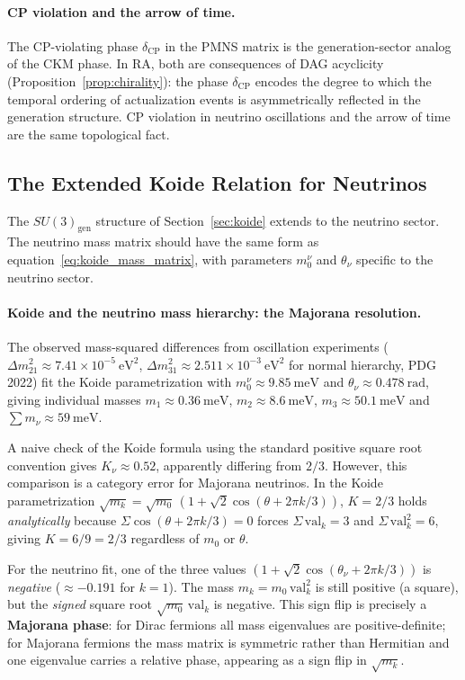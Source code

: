 \documentclass[11pt,a4paper]{article}
\begin{document}
\paragraph{CP violation and the arrow of time.}
The CP-violating phase $\delta_{\mathrm{CP}}$ in the PMNS matrix is the
generation-sector analog of the CKM phase. In RA, both are consequences of
DAG acyclicity (Proposition~\ref{prop:chirality}): the phase $\delta_{\mathrm{CP}}$
encodes the degree to which the temporal ordering of actualization events is
asymmetrically reflected in the generation structure. CP violation in neutrino
oscillations and the arrow of time are the same topological fact.

\subsection{The Extended Koide Relation for Neutrinos}

The $SU(3)_{\mathrm{gen}}$ structure of Section~\ref{sec:koide} extends to
the neutrino sector. The neutrino mass matrix should have the same form
as equation~\eqref{eq:koide_mass_matrix}, with parameters
$m_0^\nu$ and $\theta_\nu$ specific to the neutrino sector.

\paragraph{Koide and the neutrino mass hierarchy: the Majorana resolution.}
The observed mass-squared differences from oscillation experiments
($\Delta m^2_{21} \approx 7.41 \times 10^{-5}~\text{eV}^2$,
$\Delta m^2_{31} \approx 2.511 \times 10^{-3}~\text{eV}^2$ for normal hierarchy,
PDG 2022) fit the Koide parametrization with $m_0^\nu \approx 9.85~\text{meV}$ and
$\theta_\nu \approx 0.478~\text{rad}$, giving individual masses
$m_1 \approx 0.36~\text{meV}$, $m_2 \approx 8.6~\text{meV}$,
$m_3 \approx 50.1~\text{meV}$ and $\sum m_\nu \approx 59~\text{meV}$.

A naive check of the Koide formula using the standard positive square root
convention gives $K_\nu \approx 0.52$, apparently differing from $2/3$.
However, this comparison is a category error for Majorana neutrinos.
In the Koide parametrization
$\sqrt{m_k} = \sqrt{m_0}\,(1 + \sqrt{2}\cos(\theta + 2\pi k/3))$,
$K = 2/3$ holds \emph{analytically} because $\Sigma \cos(\theta + 2\pi k/3) = 0$
forces $\Sigma\,\mathrm{val}_k = 3$ and $\Sigma\,\mathrm{val}_k^2 = 6$,
giving $K = 6/9 = 2/3$ regardless of $m_0$ or $\theta$.

For the neutrino fit, one of the three values
$(1 + \sqrt{2}\cos(\theta_\nu + 2\pi k/3))$ is \emph{negative} ($\approx -0.191$
for $k=1$). The mass $m_k = m_0\,\mathrm{val}_k^2$ is still positive (a square),
but the \emph{signed} square root $\sqrt{m_0}\,\mathrm{val}_k$ is negative.
This sign flip is precisely a \textbf{Majorana phase}: for Dirac fermions all
mass eigenvalues are positive-definite; for Majorana fermions the mass matrix is
symmetric rather than Hermitian and one eigenvalue carries a relative phase,
appearing as a sign flip in $\sqrt{m_k}$.
\end{document}
